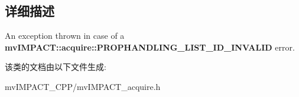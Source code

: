 \subsection{详细描述}
An exception thrown in case of a {\bfseries mv\+I\+M\+P\+A\+C\+T\+::acquire\+::\+P\+R\+O\+P\+H\+A\+N\+D\+L\+I\+N\+G\+\_\+\+L\+I\+S\+T\+\_\+\+I\+D\+\_\+\+I\+N\+V\+A\+L\+I\+D} error. 

该类的文档由以下文件生成\+:\begin{DoxyCompactItemize}
\item 
mv\+I\+M\+P\+A\+C\+T\+\_\+\+C\+P\+P/mv\+I\+M\+P\+A\+C\+T\+\_\+acquire.\+h\end{DoxyCompactItemize}
